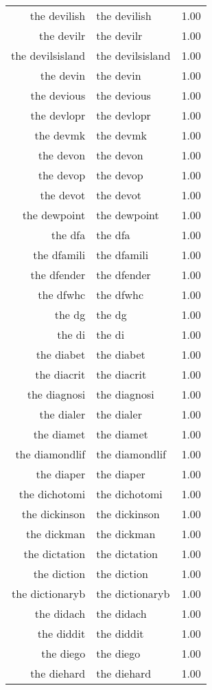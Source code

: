 \begin{table}[ht]
\begin{tabular}{rlr}
  the devilish & the devilish & 1.00 \\ 
  the devilr & the devilr & 1.00 \\ 
  the devilsisland & the devilsisland & 1.00 \\ 
  the devin & the devin & 1.00 \\ 
  the devious & the devious & 1.00 \\ 
  the devlopr & the devlopr & 1.00 \\ 
  the devmk & the devmk & 1.00 \\ 
  the devon & the devon & 1.00 \\ 
  the devop & the devop & 1.00 \\ 
  the devot & the devot & 1.00 \\ 
  the dewpoint & the dewpoint & 1.00 \\ 
  the dfa & the dfa & 1.00 \\ 
  the dfamili & the dfamili & 1.00 \\ 
  the dfender & the dfender & 1.00 \\ 
  the dfwhc & the dfwhc & 1.00 \\ 
  the dg & the dg & 1.00 \\ 
  the di & the di & 1.00 \\ 
  the diabet & the diabet & 1.00 \\ 
  the diacrit & the diacrit & 1.00 \\ 
  the diagnosi & the diagnosi & 1.00 \\ 
  the dialer & the dialer & 1.00 \\ 
  the diamet & the diamet & 1.00 \\ 
  the diamondlif & the diamondlif & 1.00 \\ 
  the diaper & the diaper & 1.00 \\ 
  the dichotomi & the dichotomi & 1.00 \\ 
  the dickinson & the dickinson & 1.00 \\ 
  the dickman & the dickman & 1.00 \\ 
  the dictation & the dictation & 1.00 \\ 
  the diction & the diction & 1.00 \\ 
  the dictionaryb & the dictionaryb & 1.00 \\ 
  the didach & the didach & 1.00 \\ 
  the diddit & the diddit & 1.00 \\ 
  the diego & the diego & 1.00 \\ 
  the diehard & the diehard & 1.00 \\ 

\end{tabular}
\end{table}

